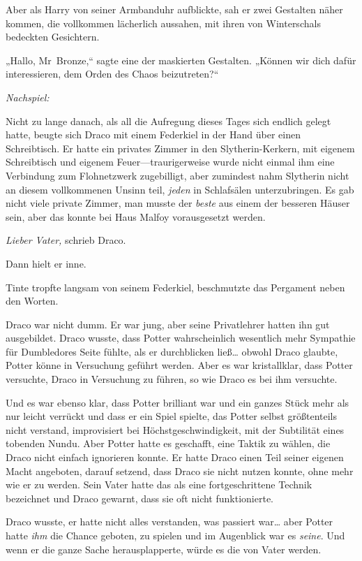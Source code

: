 {Aber als Harry von seiner Armbanduhr aufblickte, sah er zwei Gestalten näher kommen, die vollkommen lächerlich aussahen, mit ihren von Winterschals bedeckten Gesichtern.

„Hallo, Mr~Bronze,“ sagte eine der maskierten Gestalten. „Können wir dich dafür interessieren, dem Orden des Chaos beizutreten?“

\later

\emph{Nachspiel:}

Nicht zu lange danach, als all die Aufregung dieses Tages sich endlich gelegt hatte, beugte sich Draco mit einem Federkiel in der Hand über einen Schreibtisch. Er hatte ein privates Zimmer in den Slytherin-Kerkern, mit eigenem Schreibtisch und eigenem Feuer—traurigerweise wurde nicht einmal ihm eine Verbindung zum Flohnetzwerk zugebilligt, aber zumindest nahm Slytherin nicht an diesem vollkommenen Unsinn teil, \emph{jeden} in Schlafsälen unterzubringen. Es gab nicht viele private Zimmer, man musste der \emph{beste} aus einem der besseren Häuser sein, aber das konnte bei Haus Malfoy vorausgesetzt werden.

\emph{Lieber Vater,} schrieb Draco.

Dann hielt er inne.

Tinte tropfte langsam von seinem Federkiel, beschmutzte das Pergament neben den Worten.

Draco war nicht dumm. Er war jung, aber seine Privatlehrer hatten ihn gut ausgebildet. Draco wusste, dass Potter wahrscheinlich wesentlich mehr Sympathie für Dumbledores Seite fühlte, als er durchblicken ließ… obwohl Draco glaubte, Potter könne in Versuchung geführt werden. Aber es war kristallklar, dass Potter versuchte, Draco in Versuchung zu führen, so wie Draco es bei ihm versuchte.

Und es war ebenso klar, dass Potter brilliant war und ein ganzes Stück mehr als nur leicht verrückt und dass er ein Spiel spielte, das Potter selbst größtenteils nicht verstand, improvisiert bei Höchstgeschwindigkeit, mit der Subtilität eines tobenden Nundu. Aber Potter hatte es geschafft, eine Taktik zu wählen, die Draco nicht einfach ignorieren konnte. Er hatte Draco einen Teil seiner eigenen Macht angeboten, darauf setzend, dass Draco sie nicht nutzen konnte, ohne mehr wie er zu werden. Sein Vater hatte das als eine fortgeschrittene Technik bezeichnet und Draco gewarnt, dass sie oft nicht funktionierte.

Draco wusste, er hatte nicht alles verstanden, was passiert war… aber Potter hatte \emph{ihm} die Chance geboten, zu spielen und im Augenblick war es \emph{seine}. Und wenn er die ganze Sache herausplapperte, würde es die von Vater werden.

}
